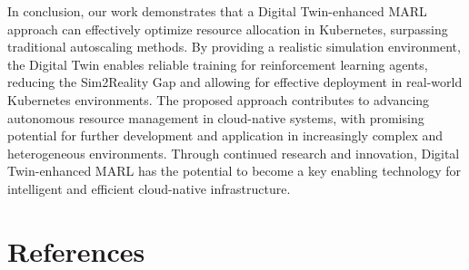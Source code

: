 \documentclass[conference]{IEEEtran}
\begin{document}
In conclusion, our work demonstrates that a Digital Twin-enhanced MARL approach can effectively optimize resource allocation in Kubernetes, surpassing traditional autoscaling methods. By providing a realistic simulation environment, the Digital Twin enables reliable training for reinforcement learning agents, reducing the Sim2Reality Gap and allowing for effective deployment in real-world Kubernetes environments. The proposed approach contributes to advancing autonomous resource management in cloud-native systems, with promising potential for further development and application in increasingly complex and heterogeneous environments. Through continued research and innovation, Digital Twin-enhanced MARL has the potential to become a key enabling technology for intelligent and efficient cloud-native infrastructure.



\section*{References}

% 



\end{document}
